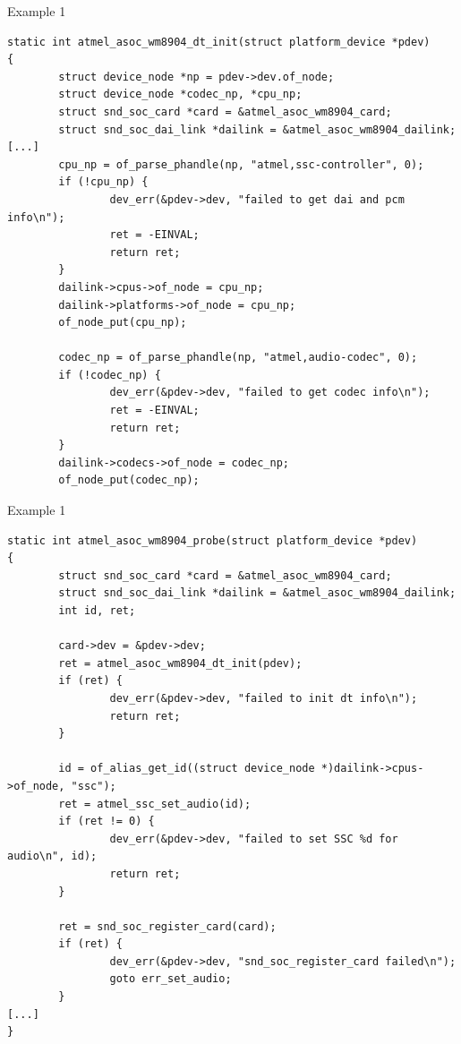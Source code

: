 \begin{frame}[fragile]{Example 1}
  \begin{block}{}
    \fontsize{8}{8}\selectfont
    \begin{verbatim}
static int atmel_asoc_wm8904_dt_init(struct platform_device *pdev)
{
        struct device_node *np = pdev->dev.of_node;
        struct device_node *codec_np, *cpu_np;
        struct snd_soc_card *card = &atmel_asoc_wm8904_card;
        struct snd_soc_dai_link *dailink = &atmel_asoc_wm8904_dailink;
[...]
        cpu_np = of_parse_phandle(np, "atmel,ssc-controller", 0);
        if (!cpu_np) {
                dev_err(&pdev->dev, "failed to get dai and pcm info\n");
                ret = -EINVAL;
                return ret;
        }
        dailink->cpus->of_node = cpu_np;
        dailink->platforms->of_node = cpu_np;
        of_node_put(cpu_np);

        codec_np = of_parse_phandle(np, "atmel,audio-codec", 0);
        if (!codec_np) {
                dev_err(&pdev->dev, "failed to get codec info\n");
                ret = -EINVAL;
                return ret;
        }
        dailink->codecs->of_node = codec_np;
        of_node_put(codec_np);
    \end{verbatim}
  \end{block}
\end{frame}

\begin{frame}[fragile]{Example 1}
  \begin{block}{}
    \fontsize{8}{8}\selectfont
    \begin{verbatim}
static int atmel_asoc_wm8904_probe(struct platform_device *pdev)
{
        struct snd_soc_card *card = &atmel_asoc_wm8904_card;
        struct snd_soc_dai_link *dailink = &atmel_asoc_wm8904_dailink;
        int id, ret;

        card->dev = &pdev->dev;
        ret = atmel_asoc_wm8904_dt_init(pdev);
        if (ret) {
                dev_err(&pdev->dev, "failed to init dt info\n");
                return ret;
        }

        id = of_alias_get_id((struct device_node *)dailink->cpus->of_node, "ssc");
        ret = atmel_ssc_set_audio(id);
        if (ret != 0) {
                dev_err(&pdev->dev, "failed to set SSC %d for audio\n", id);
                return ret;
        }

        ret = snd_soc_register_card(card);
        if (ret) {
                dev_err(&pdev->dev, "snd_soc_register_card failed\n");
                goto err_set_audio;
        }
[...]
}
    \end{verbatim}
  \end{block}
\end{frame}

